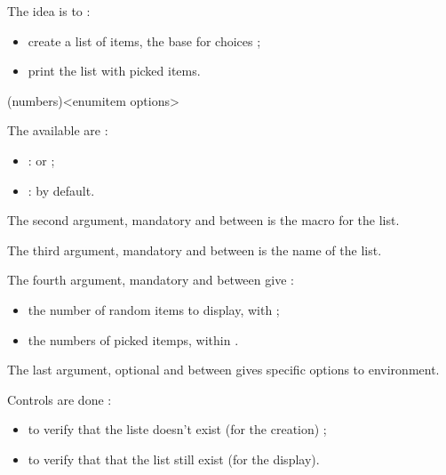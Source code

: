 \documentclass[english,11pt,a4paper]{article}
\begin{document}
The idea is to :

\begin{itemize}
	\item create a list of items, the base for choices ;
	\item print the list with picked items.
\end{itemize}

\begin{codehigh}[language=latex/latex3,style/main=teal!25,style/code=teal!25]
\end{codehigh}

\begin{codehigh}[language=latex/latex3,style/main=teal!25,style/code=teal!25]
(numbers)<enumitem options>
\end{codehigh}

The available  are :

\begin{itemize}
	\item {} :  or  ;
	\item {}  :  by default.
\end{itemize}

The second argument, mandatory and between  is the macro for the list.

The third argument, mandatory and between  is the name of the list.

The fourth argument, mandatory and between  give :

\begin{itemize}
	\item the number of random items to display, with  ;
	\item the numbers of picked itemps, within .
\end{itemize}


The last argument, optional and between  gives specific options to  environment.

\medskip

Controls are done :

\begin{itemize}
	\item to verify that the liste doesn't exist (for the creation) ;
	\item to verify that that the list still exist (for the display).
\end{itemize}
\end{document}
